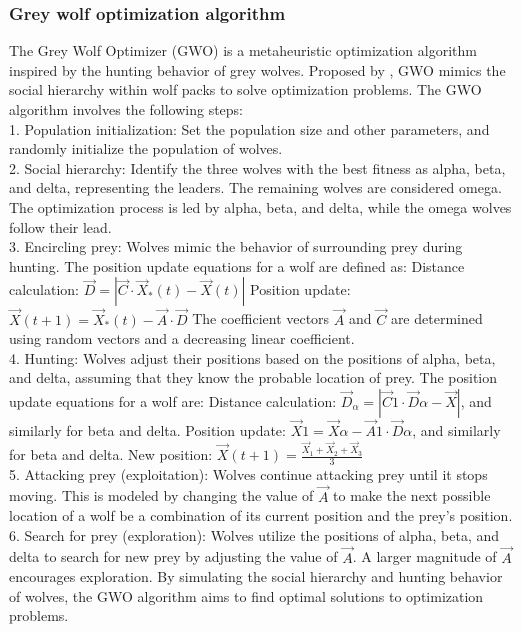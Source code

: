 \documentclass{article}
\begin{document}
\subsubsection{Grey wolf optimization algorithm}
The Grey Wolf Optimizer (GWO) is a metaheuristic optimization algorithm inspired by the hunting behavior of grey wolves. Proposed by \cite{mirjalili2014grey}, GWO mimics the social hierarchy within wolf packs to solve optimization problems.
The GWO algorithm involves the following steps:\\
1. Population initialization: Set the population size and other parameters, and randomly initialize the population of wolves.\\
2. Social hierarchy: Identify the three wolves with the best fitness as alpha, beta, and delta, representing the leaders. The remaining wolves are considered omega. The optimization process is led by alpha, beta, and delta, while the omega wolves follow their lead.\\
3. Encircling prey: Wolves mimic the behavior of surrounding prey during hunting. The position update equations for a wolf are defined as:
Distance calculation: $\overrightarrow{D} = |\overrightarrow{C} \cdot \overrightarrow{X}_*(t) - \overrightarrow{X}(t)|$
Position update: $\overrightarrow{X}(t+1) = \overrightarrow{X}_*(t) - \overrightarrow{A} \cdot \overrightarrow{D}$
The coefficient vectors $\overrightarrow{A}$ and $\overrightarrow{C}$ are determined using random vectors and a decreasing linear coefficient.\\
4. Hunting: Wolves adjust their positions based on the positions of alpha, beta, and delta, assuming that they know the probable location of prey. The position update equations for a wolf are:
Distance calculation: $\overrightarrow{D}_\alpha = |\overrightarrow{C}1 \cdot \overrightarrow{D}\alpha - \overrightarrow{X}|$, and similarly for beta and delta.
Position update: $\overrightarrow{X}1 = \overrightarrow{X}\alpha - \overrightarrow{A}1 \cdot \overrightarrow{D}\alpha$, and similarly for beta and delta.
New position: $\overrightarrow{X}(t+1) = \frac{\overrightarrow{X}_1 + \overrightarrow{X}_2 + \overrightarrow{X}_3}{3}$ \\
5. Attacking prey (exploitation): Wolves continue attacking prey until it stops moving. This is modeled by changing the value of $\overrightarrow{A}$ to make the next possible location of a wolf be a combination of its current position and the prey's position.
6. Search for prey (exploration): Wolves utilize the positions of alpha, beta, and delta to search for new prey by adjusting the value of $\overrightarrow{A}$. A larger magnitude of $\overrightarrow{A}$ encourages exploration.
By simulating the social hierarchy and hunting behavior of wolves, the GWO algorithm aims to find optimal solutions to optimization problems.\\
\end{document}
